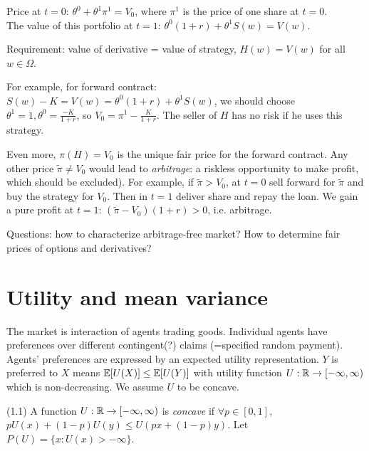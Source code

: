 \documentclass[a4paper]{article}
\begin{document}
Price at $t=0$: $\theta^0+\theta^1 \pi^1 = V_0$, where $\pi^1$ is the price of one share at $t=0$.\\
The value of this portfolio at $t=1$: $\theta^0(1+r) + \theta^1 S(w) = V(w)$.

Requirement: value of derivative = value of strategy, $H(w) = V(w)$ for all $w \in \Omega$.

For example, for forward contract: $S(w)-K = V(w) = \theta^0(1+r)+\theta^1 S(w)$, we should choose $\theta^1 = 1,\theta^0=\frac{-K}{1+r}$, so $V_0 = \pi^1 - \frac{K}{1+r}$. The seller of $H$ has no risk if he uses this strategy.

Even more, $\pi(H)=V_0$ is the unique fair price for the forward contract. Any other price $\tilde{\pi} \neq V_0$ would lead to \emph{arbitrage}: a riskless opportunity to make profit, which should be excluded). For example, if $\tilde{\pi} > V_0$, at $t=0$ sell forward for $\tilde{\pi}$ and buy the strategy for $V_0$. Then in $t=1$ deliver share and repay the loan. We gain a pure profit at $t=1$: $(\tilde{\pi}-V_0) (1+r)>0$, i.e. arbitrage.

Questions: how to characterize arbitrage-free market? How to determine fair prices of options and derivatives?

\newpage

\section{Utility and mean variance}

The market is interaction of agents trading goods. Individual agents have preferences over different contingent(?) claims (=specified random payment). Agents' preferences are expressed by an expected utility representation. $Y$ is preferred to $X$ means $\mathbb{E}[U(X)] \leq \mathbb{E}[U(Y)]$ with utility function $U: \mathbb{R} \to [-\infty,\infty)$ which is non-decreasing. We assume $U$ to be concave.

\begin{defi} 
(1.1) A function $U:\mathbb{R} \to [-\infty,\infty)$ is \emph{concave} if $\forall p \in [0,1]$, $pU(x) + (1-p) U(y) \leq U(px+(1-p)y)$. Let $P(U) = \{x: U(x)>-\infty\}$.
\end{defi}
\end{document}
